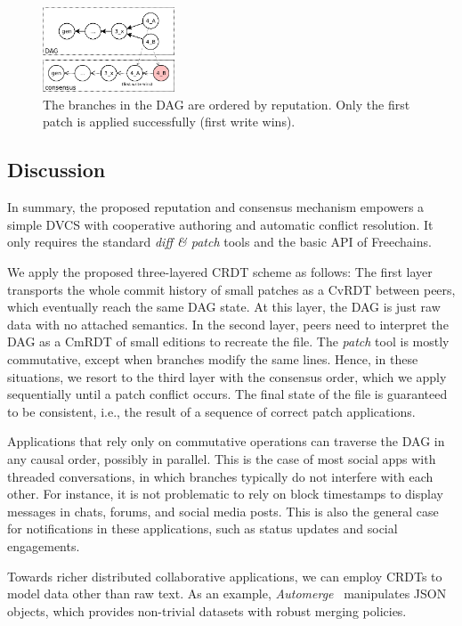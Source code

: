 \documentclass[10pt,journal,compsoc]{IEEEtran}
\newcommand{\FC}       {Freechains\xspace}
\begin{document}
\begin{figure}
\centering
\includegraphics[width=0.35\textwidth]{conflict.png}
\caption{
    The branches in the DAG are ordered by reputation.
    Only the first patch is applied successfully (first write wins).
}
\label{fig.conflict}
\end{figure}

\subsection{Discussion}

In summary, the proposed reputation and consensus mechanism empowers a simple
DVCS with cooperative authoring and automatic conflict resolution.
It only requires the standard \emph{diff \& patch} tools and the basic API of
\FC.

We apply the proposed three-layered CRDT scheme as follows:
The first layer transports the whole commit history of small patches as a CvRDT
between peers, which eventually reach the same DAG state.
At this layer, the DAG is just raw data with no attached semantics.
%
In the second layer, peers need to interpret the DAG as a CmRDT of small
editions to recreate the file.
The \emph{patch} tool is mostly commutative, except when branches modify the
same lines.
%
Hence, in these situations, we resort to the third layer with the consensus
order, which we apply sequentially until a patch conflict occurs.
The final state of the file is guaranteed to be consistent, i.e., the result of
a sequence of correct patch applications.

Applications that rely only on commutative operations can traverse the DAG in
any causal order, possibly in parallel.
This is the case of most social apps with threaded conversations, in which
branches typically do not interfere with each other.
For instance, it is not problematic to rely on block timestamps to display
messages in chats, forums, and social media posts.
This is also the general case for notifications in these applications, such as
status updates and social engagements.

Towards richer distributed collaborative applications, we can employ CRDTs to
model data other than raw text.
As an example, \emph{Automerge}~\cite{p2p.automerge} manipulates JSON objects,
which provides non-trivial datasets with robust merging policies.
\end{document}
